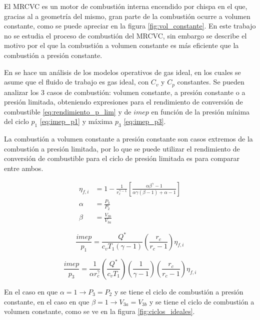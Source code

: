El MRCVC es un motor de combustión interna encendido por chispa en el que,
gracias al a geometría del mismo, gran parte de la combustión ocurre a volumen
constante, como se puede apreciar en la figura \ref{fig:vol_constante}.
%
En este trabajo no se estudia el proceso de combustión del MRCVC, sin embargo
se describe el motivo por el que la combustión a volumen constante es más
eficiente que la combustión a presión constante.

En \parencite{heywood} se hace un análisis de los modelos operativos de gas
ideal, en los cuales se asume que
el fluido de trabajo es gas ideal, con $C_v$ y $C_p$ constantes.
%
Se pueden analizar los 3 casos de combustión: volumen constante, a presión
constante o a presión limitada, obteniendo expresiones para el rendimiento de
conversión de combustible \ref{eq:rendimiento_p_lim} y de $imep$ en función de
la presión mínima del ciclo $p_1$ \ref{eq:imep_p1} y máxima $p_3$
\ref{eq:imep_p3}.

La combustión a volumen constante a presión constante son casos extremos de la
combustión a presión limitada, por lo que se puede utilizar  el rendimiento de
conversión de combustible para el ciclo de presión limitada es para comparar
entre ambos.

\begin{align}
    \label{eq:rendimiento_p_lim}
    \eta_{f,i} &= 1 - \frac{1}{r_c^{\gamma - 1}} \left[ \frac{\alpha \beta^\gamma-1}{\alpha \gamma (\beta-1)+\alpha-1} \right]\\
    \alpha &= \frac{P_3}{P_2}\\
    \beta &= \frac{V_{3b}}{V_{3a}}
\end{align}

\begin{equation}
    \label{eq:imep_p1}
    \frac{imep}{p_1} = \frac{Q^*}{c_v T_1 (\gamma-1)} \left( \frac{r_c}{r_c-1} \right) \eta_{f,i}
\end{equation}

\begin{equation}
    \label{eq:imep_p3}
    \frac{imep}{p_3} = \frac{1}{\alpha r_c^\gamma} \left( \frac{Q^*}{c_v T_1}
    \right) \left(\frac{1}{\gamma-1} \right) \left( \frac{r_c}{r_c-1} \right)
    \eta_{f,i}
\end{equation}

En el caso en que  $\alpha=1 \rightarrow P_3=P_2$ y se tiene el ciclo de
combustión a presión constante, en el caso en que $\beta=1 \rightarrow
V_{3a}=V_{3b}$ y se tiene el ciclo de combustión a volumen constante, como se
ve en la figura \ref{fig:ciclos_ideales}.

